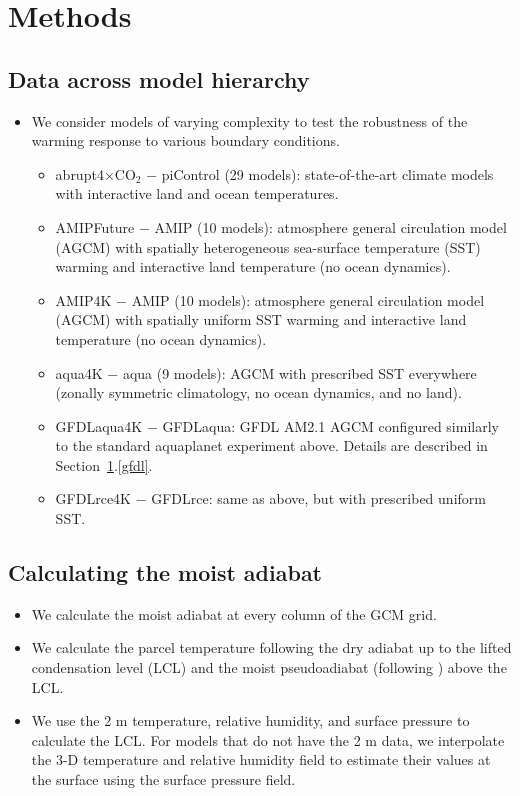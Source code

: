 \documentclass{ametsocV5}
\begin{document}
\section{Methods} \label{methods}

\subsection{Data across model hierarchy} \label{data-hierarchy}

\begin{itemize}
\item We consider models of varying complexity to test the robustness of the warming response to various boundary conditions.
\begin{itemize}
\item abrupt4$\times$CO$_2$ $-$ piControl (29 models): state-of-the-art climate models with interactive land and ocean temperatures.
\item AMIPFuture $-$ AMIP (10 models): atmosphere general circulation model (AGCM) with spatially heterogeneous sea-surface temperature (SST) warming and interactive land temperature (no ocean dynamics).
\item AMIP4K $-$ AMIP (10 models): atmosphere general circulation model (AGCM) with spatially uniform SST warming and interactive land temperature (no ocean dynamics).
\item aqua4K $-$ aqua (9 models): AGCM with prescribed SST everywhere (zonally symmetric climatology, no ocean dynamics, and no land).
\item GFDLaqua4K $-$ GFDLaqua: GFDL AM2.1 AGCM configured similarly to the standard aquaplanet experiment above. Details are described in Section~\ref{methods}.\ref{gfdl}.
\item GFDLrce4K $-$ GFDLrce: same as above, but with prescribed uniform SST.
\end{itemize}
\end{itemize}

\subsection{Calculating the moist adiabat}
\begin{itemize}
\item We calculate the moist adiabat at every column of the GCM grid.
\item We calculate the parcel temperature following the dry adiabat up to the lifted condensation level (LCL) and the moist pseudoadiabat (following \citet{emanuel-1994}) above the LCL.
\item We use the 2 m temperature, relative humidity, and surface pressure to calculate the LCL. For models that do not have the 2 m data, we interpolate the 3-D temperature and relative humidity field to estimate their values at the surface using the surface pressure field. 
\end{itemize}
\end{document}
